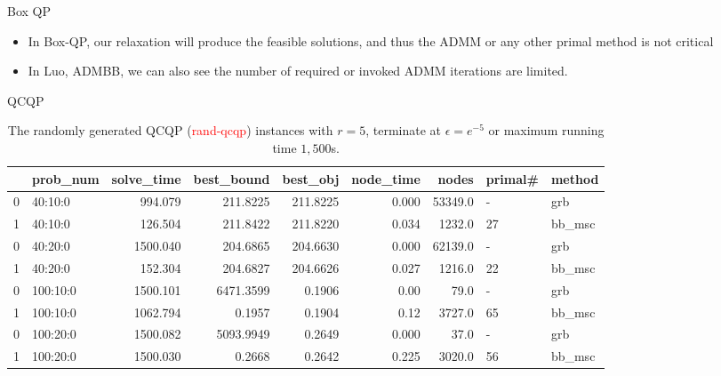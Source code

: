 \documentclass[aspectratio=1610, 9pt]{beamer}
\newcommand{\redsf}[1]{\textcolor{red}{\textsf{#1}}}
\begin{document}
\begin{frame}[standout]{Box QP}
\begin{table}[h!]
    \begin{itemize}
      \item In Box-QP, our relaxation will produce the feasible solutions, and thus the ADMM or any other primal method is not critical
      \item In \textsf{Luo, ADMBB}, we can also see the number of required or invoked ADMM iterations are limited.
    \end{itemize}
  \end{table}
  \normalsize

\end{frame}

\begin{frame}[standout]{QCQP}

  \small
  \begin{table}[h!]
    \centering
    \begin{tabular}{llrrrrrll}
      \toprule
      {} & prob\_num & solve\_time & best\_bound & best\_obj & node\_time & nodes   & primal\# & method  \\
      \midrule
      0  & 40:10:0   & 994.079     & 211.8225    & 211.8225  & 0.000      & 53349.0 & -        & grb     \\
      1  & 40:10:0   & 126.504     & 211.8422    & 211.8220  & 0.034      & 1232.0  & 27       & bb\_msc \\
      0  & 40:20:0   & 1500.040    & 204.6865    & 204.6630  & 0.000      & 62139.0 & -        & grb     \\
      1  & 40:20:0   & 152.304     & 204.6827    & 204.6626  & 0.027      & 1216.0  & 22       & bb\_msc \\
      0  & 100:10:0  & 1500.101    & 6471.3599   & 0.1906    & 0.00       & 79.0    & -        & grb     \\
      1  & 100:10:0  & 1062.794    & 0.1957      & 0.1904    & 0.12       & 3727.0  & 65       & bb\_msc \\
      0  & 100:20:0  & 1500.082    & 5093.9949   & 0.2649    & 0.000      & 37.0    & -        & grb     \\
      1  & 100:20:0  & 1500.030    & 0.2668      & 0.2642    & 0.225      & 3020.0  & 56       & bb\_msc \\
      \bottomrule
    \end{tabular}
    \caption{The randomly generated QCQP (\redsf{rand-qcqp}) instances with \(r = 5\), terminate at \(\epsilon = e^{-5}\) or maximum running time \(1,500\)s. }
  \end{table}


\end{frame}
\end{document}

